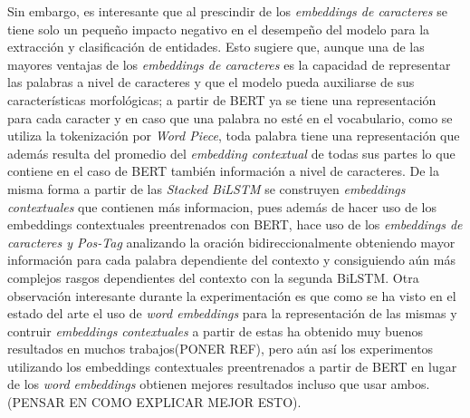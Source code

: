 Sin embargo, es interesante que al prescindir de los \emph{embeddings de caracteres} se tiene solo un peque\~no impacto negativo en el desempe\~no del modelo para la extracci\'on y clasificaci\'on de entidades. Esto sugiere que, aunque una de las mayores ventajas de los \emph{embeddings de caracteres} es la capacidad de representar las palabras a nivel de caracteres y que el modelo pueda auxiliarse de sus caracter\'isticas morfol\'ogicas; a partir de BERT ya se tiene una representaci\'on para cada caracter y en caso que una palabra no est\'e en el vocabulario, como se utiliza la tokenizaci\'on por \emph{Word Piece}, toda palabra tiene una representaci\'on que adem\'as resulta del promedio del \emph{embedding contextual} de todas sus partes lo que contiene en el caso de BERT tambi\'en informaci\'on a nivel de caracteres. De la misma forma a partir de las \emph{Stacked BiLSTM} se construyen \emph{embeddings contextuales} que contienen m\'as informacion, pues adem\'as de hacer uso de los embeddings contextuales preentrenados con BERT, hace uso de los \emph{embeddings de caracteres y Pos-Tag} analizando la oraci\'on bidireccionalmente obteniendo mayor informaci\'on para cada palabra dependiente del contexto y consiguiendo a\'un m\'as complejos rasgos dependientes del contexto con la segunda BiLSTM. Otra observaci\'on interesante durante la experimentaci\'on es que como se ha visto en el estado del arte el uso de \emph{word embeddings} para la representaci\'on de las mismas y contruir \emph{embeddings contextuales} a partir de estas ha obtenido muy buenos resultados en muchos trabajos(PONER REF), pero a\'un as\'i los experimentos utilizando los embeddings contextuales preentrenados a partir de BERT en lugar de los \emph{word embeddings} obtienen mejores resultados incluso que usar ambos.(PENSAR EN COMO EXPLICAR MEJOR ESTO).









